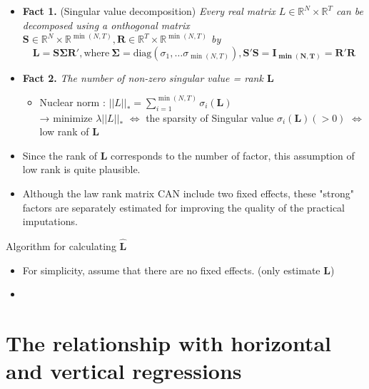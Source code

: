 \documentclass[xcolor=svgnames,aspectratio=169]{beamer}
\newcommand{\R}{\mathbb{R}}
\begin{document}
\begin{frame}
    \begin{itemize}
        \item \textbf{Fact 1.} (Singular value decomposition) \textit{Every real matrix $L\in\R^N\times \R^T$ can be decomposed using a onthogonal matrix $\mathbf{S}\in \R^N\times \R^{\min(N,T)},\mathbf{R}\in\R^T\times \R^{\min(N,T)}$ by}
        \[
        \mathbf{L}=\mathbf{S}\mathbf{\Sigma}\mathbf{R'}, \text{where} \ \mathbf{\Sigma}=\text{diag}(\sigma_1,\dots\sigma_{\min(N,T)}), \mathbf{S'S=I_{\min(N,T)}=R'R}
        \]
        \item \textbf{Fact 2.} \textit{The number of non-zero singular value = rank $\mathbf{L}$}
        \begin{itemize}
            \item Nuclear norm : $||L||_*=\sum_{i=1}^{\min(N,T)} \sigma_i(\mathbf{L})$ \\
            → minimize $\lambda||L||_*$ $\Leftrightarrow $ the sparsity of Singular value $\sigma_i(\mathbf{L})(>0)$ $\Leftrightarrow $ low rank of $\mathbf{L}$
        \end{itemize}
        \item Since the rank of $\mathbf{L}$ corresponds to \alert{the number of factor}, this assumption of low rank is quite plausible. 
        \item Although the law rank matrix CAN include two fixed effects, these "strong" factors are separately estimated for improving the quality of the practical imputations.
    \end{itemize}
\end{frame}

\begin{frame}{Algorithm for calculating $\hat{\mathbf{L}}$}
    \begin{itemize}
        \item For simplicity, assume that there are no fixed effects. (only estimate $\mathbf{L}$)
        \item 
    \end{itemize}
\end{frame}

\section{The relationship with horizontal and vertical regressions}
\end{document}

